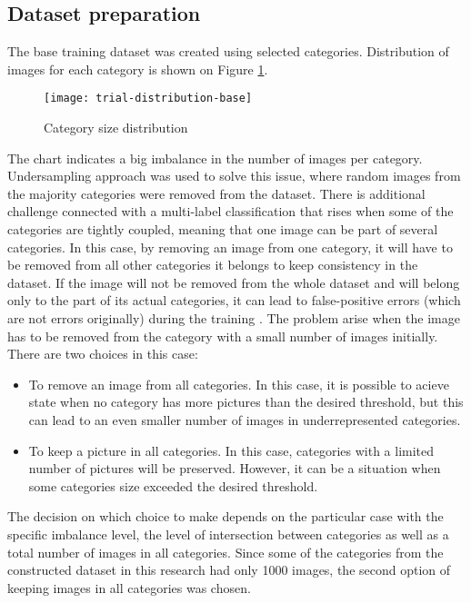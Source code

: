     \subsection{Dataset preparation}
    \label{sec:trial-dataset-prep}
    The base training dataset was created using selected categories. Distribution of images for each category is shown on Figure \ref{fig:trial-distribution-base}.
    
    \begin{figure}[H]
        \centering
        \texttt{[image: trial-distribution-base]}
        \caption[Trial experiment. Category size distribution]{Category size distribution}
        \label{fig:trial-distribution-base}
    \end{figure}
    
    The chart indicates a big imbalance in the number of images per category. Undersampling approach was used to solve this issue, where random images from the majority categories were removed from the dataset. There is additional challenge connected with a multi-label classification that rises when some of the categories are tightly coupled, meaning that one image can be part of several categories. In this case, by removing an image from one category, it will have to be removed from all other categories it belongs to keep consistency in the dataset. If the image will not be removed from the whole dataset and will belong only to the part of its actual categories, it can lead to false-positive errors (which are not errors originally) during the training \cite{Sechidis2011OnData}. The problem arise when the image has to be removed from the category with a small number of images initially. There are two choices in this case:
    
    \begin{itemize}
        \item To remove an image from all categories. In this case, it is possible to acieve state when no category has more pictures than the desired threshold, but this can lead to an even smaller number of images in underrepresented categories.
        \item To keep a picture in all categories. In this case, categories with a limited number of pictures will be preserved. However, it can be a situation when some categories size exceeded the desired threshold.
    \end{itemize}
    
    The decision on which choice to make depends on the particular case with the specific imbalance level, the level of intersection between categories as well as a total number of images in all categories. Since some of the categories from the constructed dataset in this research had only 1000 images, the second option of keeping images in all categories was chosen.
    
